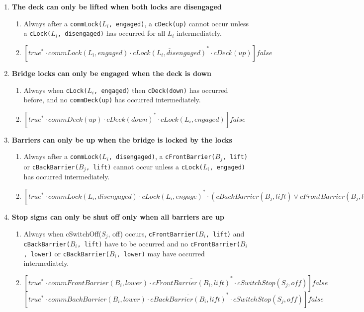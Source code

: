 \begin{enumerate}
	\item	\textbf{The deck can only be lifted when both locks are disengaged}
	\begin{enumerate}
		\item Always after a \texttt{commLock($L_i$, engaged)}, a \texttt{cDeck(up)} cannot occur unless a \texttt{cLock($L_i$, disengaged)} has occurred for all $L_i$ intermediately.
		\item $[true^* \cdot commLock(L_i, engaged)\cdot \overline{cLock(L_i, disengaged)}^{*} \cdot cDeck(up)]false$\\
	\end{enumerate}

	\item \textbf{Bridge locks can only be engaged when the deck is down}
	\begin{enumerate}
		\item Always when \texttt{cLock($L_i$, engaged)} then \texttt{cDeck(down)} has occurred before, and no \texttt{commDeck(up)} has occurred intermediately.
		\item $[true^* \cdot commDeck(up) \cdot \overline{cDeck(down)}^{*} \cdot cLock(L_i, engaged)]false$\\
	\end{enumerate}

	\item \textbf{Barriers can only be up when the bridge is locked by the locks}
	\begin{enumerate}
		\item Always after a \texttt{commLock($L_i$, disengaged)}, a \texttt{cFrontBarrier($B_j$, lift)} or \texttt{cBackBarrier($B_j$, lift)} cannot occur unless a \texttt{cLock($L_i$, engaged)} has occurred intermediately.
		\item $[true^* \cdot commLock(L_i, disengaged)\cdot \overline{cLock(L_i, engage)}^{*} \cdot (cBackBarrier(B_j, lift) \vee cFrontBarrier(B_j, lift))]false$\\
	\end{enumerate}

	\item \textbf{Stop signs can only be shut off only when all barriers are up}
	\begin{enumerate}
		\item Always when cSwitchOff($S_j$, off) occurs, \texttt{cFrontBarrier($B_i$, lift)} and \texttt{cBackBarrier($B_i$, lift)} have to be occurred and no \texttt{cFrontBarrier($B_i$, lower)} or \texttt{cBackBarrier($B_i$, lower)} may have occurred intermediately.
		\item $[true^* \cdot commFrontBarrier(B_i, lower) \cdot \overline{cFrontBarrier(B_i, lift)}^{*} \cdot cSwitchStop(S_j, off)]false$
					$[true^* \cdot commBackBarrier(B_i, lower) \cdot \overline{cBackBarrier(B_i, lift)}^{*} \cdot cSwitchStop(S_j, off)]false$
	\end{enumerate}


\end{enumerate}
